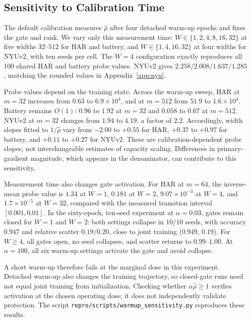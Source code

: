 \documentclass{article}
\begin{document}
\subsection{Sensitivity to Calibration Time}\label{app:warmup}

The default calibration measures $\hat\rho$ after four detached warm-up epochs and fixes the gate and rank. We vary only this measurement time: $W\in\{1,2,4,8,16,32\}$ at five widths $32$--$512$ for HAR and battery, and $W\in\{1,4,16,32\}$ at four widths for NYUv2, with ten seeds per cell. The $W=4$ configuration exactly reproduces all 100 shared HAR and battery probe values. NYUv2 gives $2.258/2.008/1.637/1.285$, matching the rounded values in Appendix~\ref{app:nyu}.

Probe values depend on the training state. Across the warm-up sweep, HAR at $m=32$ increases from $0.63$ to $6.9\times10^4$, and at $m=512$ from $51.9$ to $1.6\times10^4$. Battery remains $O(1)$: $0.96$ to $1.92$ at $m=32$ and $0.058$ to $0.67$ at $m=512$. NYUv2 at $m=32$ changes from $1.94$ to $4.19$, a factor of $2.2$. Accordingly, width slopes fitted to $1/\hat\rho$ vary from $-2.00$ to $+0.55$ for HAR, $+0.37$ to $+0.97$ for battery, and $+0.11$ to $+0.27$ for NYUv2. These are calibration-dependent probe slopes, not interchangeable estimates of capacity scaling. Differences in primary-gradient magnitude, which appears in the denominator, can contribute to this sensitivity.

Measurement time also changes gate activation. For HAR at $m=64$, the inverse-mean probe value is $1.34$ at $W=1$, $0.181$ at $W=2$, $9.07\times10^{-3}$ at $W=4$, and $1.7\times10^{-5}$ at $W=32$, compared with the measured transition interval $[0.001,0.01]$. In the sixty-epoch, ten-seed experiment at $\alpha=0.03$, gates remain closed for $W=1$ and $W=2$: both settings collapse in $10/10$ seeds, with accuracy $0.947$ and relative scatter $0.19/0.20$, close to joint training ($0.949$, $0.19$). For $W\ge4$, all gates open, no seed collapses, and scatter returns to $0.99$--$1.00$. At $\alpha=100$, all six warm-up settings activate the gate and avoid collapse.

A short warm-up therefore fails at the marginal dose in this experiment. Detached warm-up also changes the training trajectory, so closed-gate runs need not equal joint training from initialization. Checking whether $\alpha\hat\rho\ge1$ verifies activation at the chosen operating dose; it does not independently validate protection. The script \texttt{repro/scripts/warmup\_sensitivity.py} reproduces these results.
\end{document}
